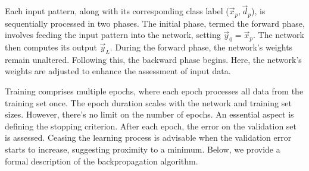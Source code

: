 \documentclass[a4paper]{report}
\begin{document}
{Each input pattern, along with its corresponding class label (\(\vec{x}_p, \vec{d}_p\)), is sequentially processed in two phases. The initial phase, termed the forward phase, involves feeding the input pattern into the network, setting \(\vec{y}_0 = \vec{x}_p\). The network then computes its output \(\vec{y}_L\). During the forward phase, the network's weights remain unaltered. Following this, the backward phase begins. Here, the network's weights are adjusted to enhance the assessment of input data.

Training comprises multiple epochs, where each epoch processes all data from the training set once. The epoch duration scales with the network and training set sizes. However, there's no limit on the number of epochs. An essential aspect is defining the stopping criterion. After each epoch, the error on the validation set is assessed. Ceasing the learning process is advisable when the validation error starts to increase, suggesting proximity to a minimum. Below, we provide a formal description of the backpropagation algorithm.

}
\end{document}
